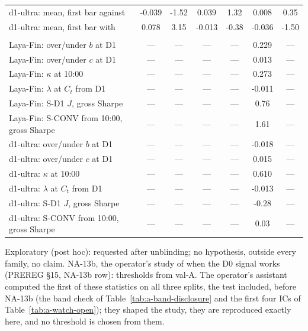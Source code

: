 \begin{table}[htbp]
\begin{threeparttable}
\begin{tabular}{@{}>{\raggedright\arraybackslash}p{2.95in}S[table-format=-1.3]S[table-format=-1.2]S[table-format=-1.3]S[table-format=-1.2]S[table-format=-1.3]S[table-format=-1.2]@{}}
d1-ultra: mean, first bar against & -0.039 & -1.52 & 0.039 & 1.32 & 0.008 & 0.35 \\
d1-ultra: mean, first bar with & 0.078 & 3.15 & -0.013 & -0.38 & -0.036 & -1.50 \\
\addlinespace
{} \\
Laya-Fin: over/under $b$ at D1 & {---} & {---} & {---} & {---} & 0.229 & {---} \\
Laya-Fin: over/under $c$ at D1 & {---} & {---} & {---} & {---} & 0.013 & {---} \\
Laya-Fin: $\kappa$ at 10:00 & {---} & {---} & {---} & {---} & 0.273 & {---} \\
Laya-Fin: $\lambda$ at $C_t$ from D1 & {---} & {---} & {---} & {---} & -0.011 & {---} \\
Laya-Fin: S-D1 $J$, gross Sharpe & {---} & {---} & {---} & {---} & 0.76 & {---} \\
Laya-Fin: S-CONV from 10:00, gross Sharpe & {---} & {---} & {---} & {---} & 1.61 & {---} \\
d1-ultra: over/under $b$ at D1 & {---} & {---} & {---} & {---} & -0.018 & {---} \\
d1-ultra: over/under $c$ at D1 & {---} & {---} & {---} & {---} & 0.015 & {---} \\
d1-ultra: $\kappa$ at 10:00 & {---} & {---} & {---} & {---} & 0.610 & {---} \\
d1-ultra: $\lambda$ at $C_t$ from D1 & {---} & {---} & {---} & {---} & -0.013 & {---} \\
d1-ultra: S-D1 $J$, gross Sharpe & {---} & {---} & {---} & {---} & -0.28 & {---} \\
d1-ultra: S-CONV from 10:00, gross Sharpe & {---} & {---} & {---} & {---} & 0.03 & {---} \\
\bottomrule
\end{tabular}
\begin{tablenotes}[flushleft]\footnotesize
\item Exploratory (post hoc): requested after unblinding; no hypothesis, outside every family, no claim. NA-13b, the operator's study of when the D0 signal works (PREREG \S15, NA-13b row): thresholds from val-A. The operator's assistant computed the first of these statistics on all three splits, the test included, before NA-13b (the band check of Table~\ref{tab:a-band-disclosure} and the first four ICs of Table~\ref{tab:a-watch-open}); they shaped the study, they are reproduced exactly here, and no threshold is chosen from them.

\end{tablenotes}
\end{threeparttable}
\end{table}
